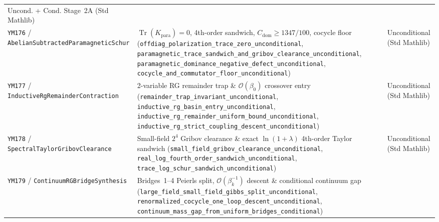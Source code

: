 \documentclass[11pt,a4paper]{article}
\begin{document}
\begin{table}[ht]
\begin{tabular}{@{}p{4.3cm}p{6.6cm}p{3.4cm}@{}}
Uncond. + Cond. Stage~2A (Std Mathlib) \\
\texttt{YM176} / \texttt{AbelianSubtracted\allowbreak ParamagneticSchur} &
$\operatorname{Tr}(K_{\mathrm{para}}){=}0$, 4th-order sandwich, $C_{\mathrm{dom}} \ge 1347/100$, cocycle floor (\texttt{offdiag\_\allowbreak polarization\_\allowbreak trace\_\allowbreak zero\_\allowbreak unconditional}, \texttt{paramagnetic\_\allowbreak trace\_\allowbreak sandwich\_\allowbreak and\_\allowbreak gribov\_\allowbreak clearance\_\allowbreak unconditional}, \texttt{paramagnetic\_\allowbreak dominance\_\allowbreak negative\_\allowbreak defect\_\allowbreak unconditional}, \texttt{cocycle\_\allowbreak and\_\allowbreak commutator\_\allowbreak floor\_\allowbreak unconditional}) &
Unconditional (Std Mathlib) \\
\texttt{YM177} / \texttt{InductiveRg\allowbreak RemainderContraction} &
2-variable RG remainder trap \& $\mathcal{O}(\beta_0)$ crossover entry (\texttt{remainder\_\allowbreak trap\_\allowbreak invariant\_\allowbreak unconditional}, \texttt{inductive\_\allowbreak rg\_\allowbreak basin\_\allowbreak entry\_\allowbreak unconditional}, \texttt{inductive\_\allowbreak rg\_\allowbreak remainder\_\allowbreak uniform\_\allowbreak bound\_\allowbreak unconditional}, \texttt{inductive\_\allowbreak rg\_\allowbreak strict\_\allowbreak coupling\_\allowbreak descent\_\allowbreak unconditional}) &
Unconditional (Std Mathlib) \\
\texttt{YM178} / \texttt{SpectralTaylor\allowbreak GribovClearance} &
Small-field $2^4$ Gribov clearance \& exact $\ln(1+\lambda)$ 4th-order Taylor sandwich (\texttt{small\_\allowbreak field\_\allowbreak gribov\_\allowbreak clearance\_\allowbreak unconditional}, \texttt{real\_\allowbreak log\_\allowbreak fourth\_\allowbreak order\_\allowbreak sandwich\_\allowbreak unconditional}, \texttt{trace\_\allowbreak log\_\allowbreak schur\_\allowbreak sandwich\_\allowbreak unconditional}) &
Unconditional (Std Mathlib) \\
\texttt{YM179} / \texttt{ContinuumRG\allowbreak BridgeSynthesis} &
Bridges~1--4 Peierls split, $\mathcal{O}(\beta_k^{-1})$ descent \& conditional continuum gap (\texttt{large\_\allowbreak field\_\allowbreak small\_\allowbreak field\_\allowbreak gibbs\_\allowbreak split\_\allowbreak unconditional}, \texttt{renormalized\_\allowbreak cocycle\_\allowbreak one\_\allowbreak loop\_\allowbreak descent\_\allowbreak unconditional}, \texttt{continuum\_\allowbreak mass\_\allowbreak gap\_\allowbreak from\_\allowbreak uniform\_\allowbreak bridges\_\allowbreak conditional}) &

\end{tabular}
\end{table}
\end{document}
